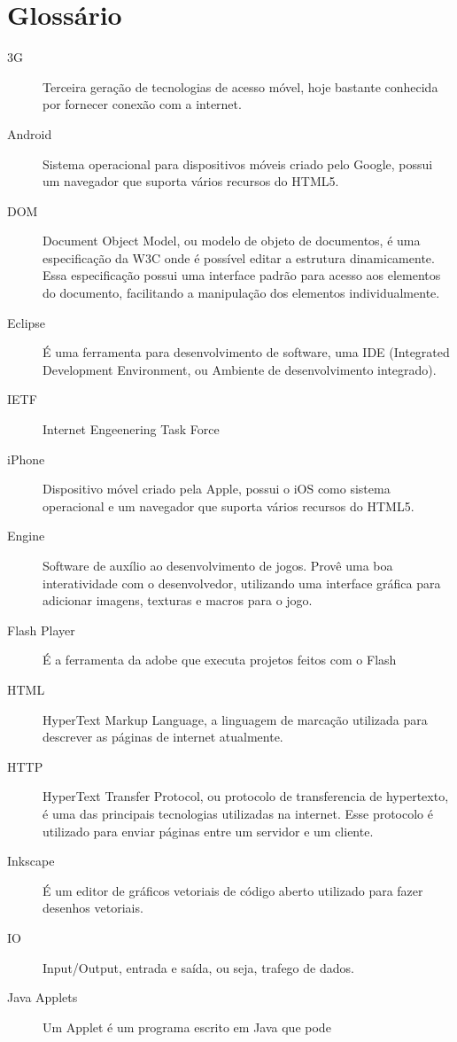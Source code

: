 
\section*{Glossário}

\begin{description}
\item[3G ] Terceira geração de tecnologias de acesso móvel, hoje
bastante conhecida por fornecer conexão com a internet.
\item[Android ] Sistema operacional para dispositivos móveis criado
pelo Google, possui um navegador que suporta vários recursos do HTML5.
\item[DOM ] Document Object Model, ou modelo de objeto de documentos,
é uma especificação da W3C onde é possível editar a estrutura
dinamicamente. Essa especificação possui uma interface padrão para
acesso aos elementos do documento, facilitando a manipulação dos
elementos individualmente.
\item[Eclipse ] É uma ferramenta para desenvolvimento de software, uma
IDE (Integrated Development Environment, ou Ambiente de
desenvolvimento integrado).
\item[IETF ] Internet Engeenering Task Force
\item[iPhone ] Dispositivo móvel criado pela Apple, possui o iOS como
sistema operacional e um navegador que suporta vários recursos do HTML5.
\item[Engine ] Software de auxílio ao desenvolvimento de jogos. Provê
uma boa interatividade com o desenvolvedor, utilizando uma interface
gráfica para adicionar imagens, texturas e macros para o jogo.
\item[Flash Player ] É a ferramenta da adobe que executa projetos
feitos com o Flash
\item[HTML ] HyperText Markup Language, a linguagem de marcação
utilizada para descrever as páginas de internet atualmente.
\item[HTTP ] HyperText Transfer Protocol, ou protocolo de
transferencia de hypertexto, é uma das principais tecnologias
utilizadas na internet. Esse protocolo é utilizado para enviar páginas
entre um servidor e um cliente.
\item[Inkscape ] É um editor de gráficos vetoriais de código aberto
utilizado para fazer desenhos vetoriais.
\item[IO ] Input/Output, entrada e saída, ou seja, trafego de dados.
\item[Java Applets ] Um Applet é um programa escrito em Java que pode

\end{description}
